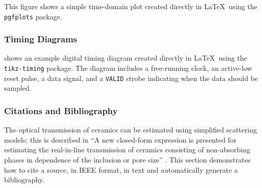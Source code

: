 This figure shows a simple time-domain plot created directly in \LaTeX\ using the \verb|pgfplots| package.




\subsubsection{Timing Diagrams}

 shows an example digital timing diagram created directly in \LaTeX\ using the \texttt{tikz-timing} package. The diagram includes a free-running clock, an active-low reset pulse, a data signal, and a \texttt{VALID} strobe indicating when the data should be sampled.



\subsubsection{Citations and Bibliography}

The optical transmission of ceramics can be estimated using simplified scattering models; this is described in “A new closed-form expression is presented for estimating the real-in-line transmission of ceramics consisting of non-absorbing phases in dependence of the inclusion or pore size” \cite{pabst_mie_approx_2013}. This section demonstrates how to cite a source, in IEEE format, in text and automatically generate a bibliography.



